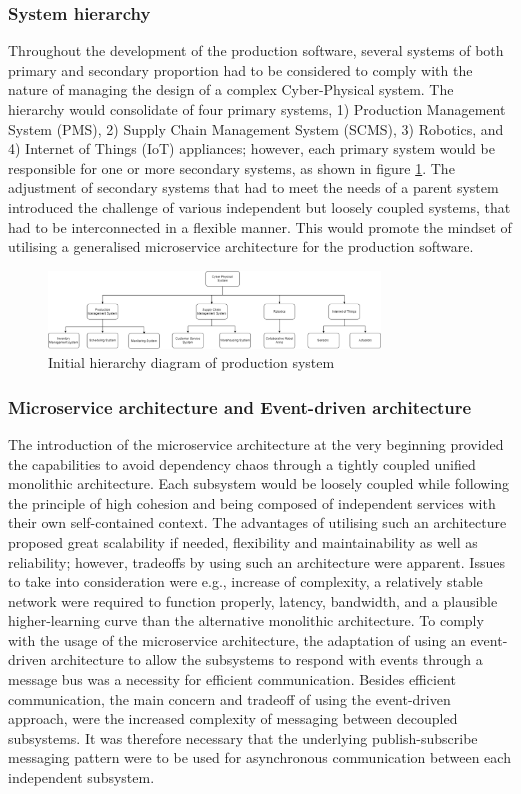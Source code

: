 \subsubsection{System hierarchy}
Throughout the development of the production software, several systems of both primary and secondary proportion had to be considered to comply with the nature of managing the design of a complex Cyber-Physical system. The hierarchy would consolidate of four primary systems, 1) Production Management System (PMS), 2) Supply Chain Management System (SCMS), 3) Robotics, and 4) Internet of Things (IoT) appliances; however, each primary system would be responsible for one or more secondary systems, as shown in figure \ref{fig:hierarchy}. The adjustment of secondary systems that had to meet the needs of a parent system introduced the challenge of various independent but loosely coupled systems, that had to be interconnected in a flexible manner. This would promote the mindset of utilising a generalised microservice architecture for the production software.  
\newpage
\begin{figure}[!htb]
    \includegraphics[width=250pt]{images/hierarchy.png}
    \caption{Initial hierarchy diagram of production system}
    \label{fig:hierarchy}
\end{figure}

\subsubsection{Microservice architecture and Event-driven architecture}
The introduction of the microservice architecture at the very beginning provided the capabilities to avoid dependency chaos through a tightly coupled unified monolithic architecture. Each subsystem would be loosely coupled while following the principle of high cohesion and being composed of independent services with their own self-contained context. The advantages of utilising such an architecture proposed great scalability if needed, flexibility and maintainability as well as reliability; however, tradeoffs by using such an architecture were apparent. Issues to take into consideration were e.g., increase of complexity, a relatively stable network were required to function properly, latency, bandwidth, and a plausible higher-learning curve than the alternative monolithic architecture. To comply with the usage of the microservice architecture, the adaptation of using an event-driven architecture to allow the subsystems to respond with events through a message bus was a necessity for efficient communication. Besides efficient communication, the main concern and tradeoff of using the event-driven approach, were the increased complexity of messaging between decoupled subsystems. It was therefore necessary that the underlying publish-subscribe messaging pattern were to be used for asynchronous communication between each independent subsystem. 
